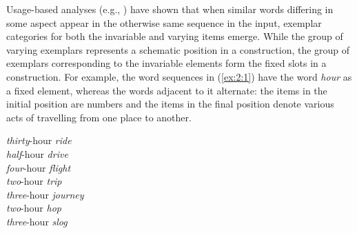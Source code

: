 Usage-based analyses (e.g., \citealt{boas-2003, lieven-etal-2003, goldberg-etal-2004, dabrowska-lieven-2005, bybee-eddington, boyd-goldberg-2011}) have shown that when similar words differing in some aspect appear in the otherwise same sequence in the input, exemplar categories for both the invariable and varying items emerge. While the group of varying exemplars represents a schematic position in a construction, the group of exemplars corresponding to the invariable elements form the fixed slots in a construction. For example, the word sequences in (\ref{ex:2:1}) have the word \textit{hour} as a fixed element, whereas the words adjacent to it alternate: the items in the initial position are numbers and the items in the final position denote various acts of travelling from one place to another.

\ea
	\label{ex:2:1}
	\textit{thirty}-hour \textit{ride}\\
	\textit{half}-hour \textit{drive}\\
	\textit{four}-hour \textit{flight}\\
	\textit{two}-hour \textit{trip}\\
	\textit{three}-hour \textit{journey}\\
	\textit{two}-hour \textit{hop}\\
	\textit{three}-hour \textit{slog}\\
	\hspace*{62mm} \citep[data from][16-7]{hoey-lexical-2005}
\z

